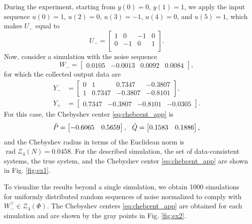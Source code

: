 \documentclass[pdflatex,sn-mathphys-num]{sn-jnl}%
\DeclareMathOperator{\rad}{rad}
\theoremstyle{thmstyleone}
\begin{document}
During the experiment, starting from $y(0)=0$, $y(1)=1$, we apply the input sequence $u(0)=1$, $u(2)=0$, $u(3)=-1$, $u(4)=0$, and $u(5)=1$, which makes $U_-$ equal to
\begin{equation}
U_-=\begin{bmatrix}
1 & 0 & -1 & 0 \\
 0 & -1 & 0 & 1 \\
\end{bmatrix}.
\end{equation}
Now, consider a simulation with the noise sequence
\begin{equation}
W_-=\begin{bmatrix}
0.0105 & -0.0013 & 0.0092 & 0.0084
\end{bmatrix},
\end{equation}
for which the collected output data are
\begin{equation}
\begin{split}
Y_-&=\begin{bmatrix}
0 & 1 & 0.7347 & -0.3807 \\
1 & 0.7347 & -0.3807 & -0.8101
\end{bmatrix}, \\
Y_+&=\begin{bmatrix}
0.7347 & -0.3807 & -0.8101 & -0.0305
\end{bmatrix}.
\end{split}
\end{equation}
For this case, the Chebyshev center \eqref{eq:chebcent_app} is
\begin{equation}
\hat{P}=\begin{bmatrix}
-0.6065 & 0.5659
\end{bmatrix},\hspace{0.25cm} \hat{Q}=\begin{bmatrix}
0.1583 & 0.1886
\end{bmatrix},
\end{equation}
and the Chebyshev radius in terms of the Euclidean norm is $\rad\mathcal{Z}_4(N)=0.0458$. For the described simulation, the set of data-consistent systems, the true system, and the Chebyshev center \eqref{eq:chebcent_app} are shown in Fig. \ref{fig:ex1}. 

To visualize the results beyond a single simulation, we obtain 1000 simulations for uniformly distributed random sequences of noise normalized to comply with \mbox{$W_-^\top\in\mathcal{Z}_4(\Phi)$}. The Chebyshev centers \eqref{eq:chebcent_app} are obtained for each simulation and are shown by the gray points in Fig. \ref{fig:ex2}.
\end{document}
